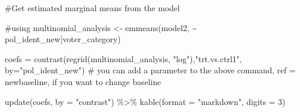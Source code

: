 \documentclass[
  letterpaper,
  DIV=11,
  numbers=noendperiod]{scrartcl}
\newenvironment{Shaded}{\begin{snugshade}}{\end{snugshade}}
\newcommand{\AttributeTok}[1]{\textcolor[rgb]{0.40,0.45,0.13}{#1}}
\newcommand{\CommentTok}[1]{\textcolor[rgb]{0.37,0.37,0.37}{#1}}
\newcommand{\DecValTok}[1]{\textcolor[rgb]{0.68,0.00,0.00}{#1}}
\newcommand{\FunctionTok}[1]{\textcolor[rgb]{0.28,0.35,0.67}{#1}}
\newcommand{\NormalTok}[1]{\textcolor[rgb]{0.00,0.23,0.31}{#1}}
\newcommand{\OtherTok}[1]{\textcolor[rgb]{0.00,0.23,0.31}{#1}}
\newcommand{\SpecialCharTok}[1]{\textcolor[rgb]{0.37,0.37,0.37}{#1}}
\newcommand{\StringTok}[1]{\textcolor[rgb]{0.13,0.47,0.30}{#1}}
\begin{document}
\begin{Shaded}
\begin{Highlighting}[]
\CommentTok{\#Get estimated marginal means from the model}

\CommentTok{\#using }
\NormalTok{multinomial\_analysis }\OtherTok{\textless{}{-}} \FunctionTok{emmeans}\NormalTok{(model2, }\SpecialCharTok{\textasciitilde{}}\NormalTok{ pol\_ident\_new}\SpecialCharTok{|}\NormalTok{voter\_category)}

\NormalTok{coefs }\OtherTok{=} \FunctionTok{contrast}\NormalTok{(}\FunctionTok{regrid}\NormalTok{(multinomial\_analysis, }\StringTok{"log"}\NormalTok{),}\StringTok{"trt.vs.ctrl1"}\NormalTok{,  }\AttributeTok{by=}\StringTok{"pol\_ident\_new"}\NormalTok{)}
\CommentTok{\# you can add a parameter to the above command, ref = newbaseline, if you want to change baseline}

\FunctionTok{update}\NormalTok{(coefs, }\AttributeTok{by =} \StringTok{"contrast"}\NormalTok{) }\SpecialCharTok{\%\textgreater{}\%}
 \FunctionTok{kable}\NormalTok{(}\AttributeTok{format =} \StringTok{"markdown"}\NormalTok{, }\AttributeTok{digits =} \DecValTok{3}\NormalTok{)}
\end{Highlighting}
\end{Shaded}
\end{document}
